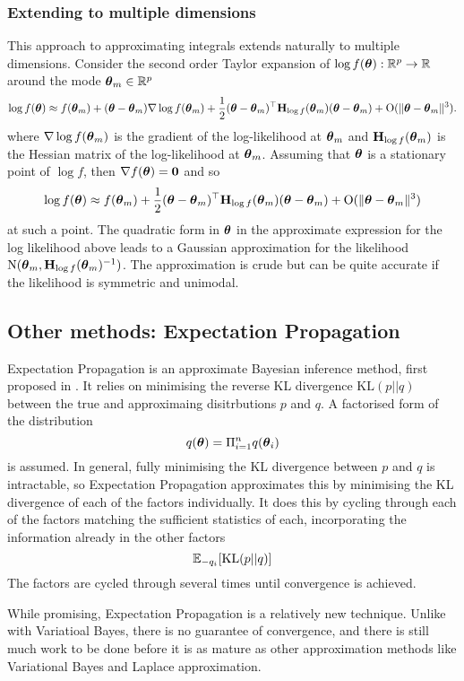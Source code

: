 \subsubsection{Extending to multiple dimensions}
This approach to approximating integrals extends naturally to multiple dimensions. Consider the second order
Taylor expansion of $\log f({\boldsymbol \theta}): {\mathbb{R}}^p \to {\mathbb{R}}$ around the mode ${\boldsymbol \theta}_m \in {\mathbb{R}}^p$
$$
\log f({\boldsymbol \theta}) \approx f({\boldsymbol \theta}_m) + ({\boldsymbol \theta} - {\boldsymbol \theta}_m) \nabla \log f({\boldsymbol \theta}_m) + \frac{1}{2} ({\boldsymbol \theta} - {\boldsymbol \theta}_m)^\top {\bf H}_{\log f}({\boldsymbol \theta}_m) ({\boldsymbol \theta} - {\boldsymbol \theta}_m) + \text{O}(\|{\boldsymbol \theta} - {\boldsymbol \theta}_m\|^3).
$$
where $\nabla \log f({\boldsymbol \theta}_m)$ is the gradient of the log-likelihood at ${\boldsymbol \theta}_m$ and ${\bf H}_{\log
f}({\boldsymbol \theta}_m)$ is the Hessian matrix of the log-likelihood at ${\boldsymbol \theta}_m$. Assuming that ${\boldsymbol \theta}$ is a
stationary point of $\log f$, then $\nabla f({\boldsymbol \theta}) = {\bf 0}$ and so
$$
\log f({\boldsymbol \theta}) \approx f({\boldsymbol \theta}_m) + \frac{1}{2} ({\boldsymbol \theta} - {\boldsymbol \theta}_m)^\top {\bf H}_{\log f}({\boldsymbol \theta}_m) ({\boldsymbol \theta} - {\boldsymbol \theta}_m) + \text{O}(\|{\boldsymbol \theta} - {\boldsymbol \theta}_m\|^3)
$$
\noindent at such a point. The quadratic form in ${\boldsymbol \theta}$ in the approximate expression for the log
likelihood above leads to a Gaussian approximation for the likelihood $\text{N}({\boldsymbol \theta}_m, {\bf H}_{\log
f}({\boldsymbol \theta}_m)^{-1})$. The approximation is crude but can be quite accurate if the likelihood is symmetric and
unimodal.

\subsection{Other methods: Expectation Propagation}
Expectation Propagation is an approximate Bayesian inference method, first proposed in \citep{Minka2001}.
It relies on minimising the reverse KL divergence $\text{KL}(p || q)$ between the true and approximaing
disitrbutions $p$ and $q$. A factorised form of the distribution
\[
	q({\boldsymbol \theta}) = \Pi_{i=1}^n q({\boldsymbol \theta}_i)
\]
is assumed. In general, fully minimising the KL divergence between $p$ and $q$ is intractable, so Expectation
Propagation approximates this by minimising the KL divergence of each of the factors individually.
It does this by cycling through each of the factors matching the sufficient statistics of each, incorporating
the information already in the other factors
\[
	{\mathbb E}_{-q_i} [\text{KL}(p || q)]
\]
The factors are cycled through several times until convergence is achieved.

While promising, Expectation Propagation is a relatively new technique.
Unlike with Variatioal Bayes, there is no guarantee of convergence, and there is still much work to be done
before it is as mature as other approximation methods like Variational Bayes and Laplace approximation.

